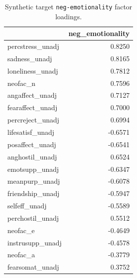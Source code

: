 \documentclass{article}
\begin{document}
\begin{table}[H]
\caption{Synthetic target \texttt{neg-emotionality} factor loadings.}\label{tab:neg-emotionality}
\centering
\begin{tabular}{lr}
\toprule
 & neg\_emotionality \\
\midrule
percstress\_unadj & 0.8250 \\
sadness\_unadj & 0.8165 \\
loneliness\_unadj & 0.7812 \\
neofac\_n & 0.7596 \\
angaffect\_unadj & 0.7127 \\
fearaffect\_unadj & 0.7000 \\
percreject\_unadj & 0.6994 \\
lifesatisf\_unadj & -0.6571 \\
posaffect\_unadj & -0.6541 \\
anghostil\_unadj & 0.6524 \\
emotsupp\_unadj & -0.6347 \\
meanpurp\_unadj & -0.6078 \\
friendship\_unadj & -0.5947 \\
selfeff\_unadj & -0.5589 \\
perchostil\_unadj & 0.5512 \\
neofac\_e & -0.4649 \\
instrusupp\_unadj & -0.4578 \\
neofac\_a & -0.3779 \\
fearsomat\_unadj & 0.3752 \\
\bottomrule
\end{tabular}

\end{table}
\end{document}
